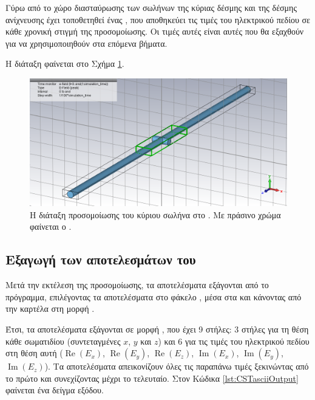 Γύρω από το χώρο διασταύρωσης των σωλήνων της κύριας δέσμης και της δέσμης ανίχνευσης έχει τοποθετηθεί ένας , που αποθηκεύει τις τιμές του ηλεκτρικού πεδίου σε κάθε χρονική στιγμή της προσομοίωσης. 
Οι τιμές αυτές είναι αυτές που θα εξαχθούν για να χρησιμοποιηθούν στα επόμενα βήματα.

Η διάταξη φαίνεται στο Σχήμα \ref{fig:CST-export-main-beam-project-efield-box}.

\begin{figure}[tbh]
\includegraphics[width=\textwidth]{figures/export-main-beam-project-efield-box}
\centering
\caption[Η διάταξη προσομοίωσης του κύριου σωλήνα στο .]
{Η διάταξη προσομοίωσης του κύριου σωλήνα στο .
Με πράσινο χρώμα φαίνεται ο .}
\label{fig:CST-export-main-beam-project-efield-box}
\end{figure}

\subsection{Εξαγωγή των αποτελεσμάτων του }
Μετά την εκτέλεση της προσομοίωσης, τα αποτελέσματα εξάγονται από το πρόγραμμα, επιλέγοντας τα αποτελέσματα στο φάκελο , μέσα στα  και κάνοντας  από την καρτέλα  στη μορφή .

Έτσι, τα αποτελέσματα εξάγονται σε μορφή , που έχει 9 στήλες: 3 στήλες για τη θέση κάθε σωματιδίου (συντεταγμένες $x$, $y$ και $z$) και 6 για τις τιμές του ηλεκτρικού πεδίου στη θέση αυτή ($\operatorname{Re}(E_x)$, $\operatorname{Re}(E_y)$, $\operatorname{Re}(E_z)$, $\operatorname{Im}(E_x)$, $\operatorname{Im}(E_y)$, $\operatorname{Im}(E_z)$).
Τα αποτελέσματα απεικονίζουν όλες τις παραπάνω τιμές ξεκινώντας από το πρώτο  και συνεχίζοντας μέχρι το τελευταίο.
Στον Κώδικα \ref{lst:CSTasciiOutput} φαίνεται ένα δείγμα εξόδου.

